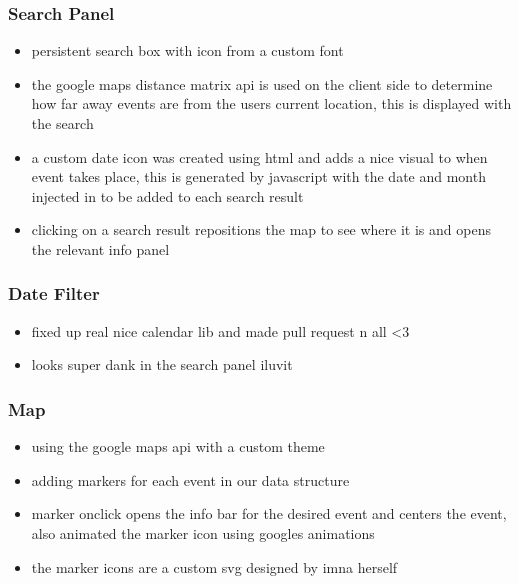 \documentclass[10pt]{article}
\begin{document}
            \subsubsection{Search Panel}

                \begin{itemize}
                    \item persistent search box with icon from a custom font
                    \item the google maps distance matrix api is used on the client side to determine how far away events are from the users current location, this is displayed with the search
                    \item a custom date icon was created using html and adds a nice visual to when event takes place, this is generated by javascript with the date and month injected in to be added to each search result
                    \item clicking on a search result repositions the map to see where it is and opens the relevant info panel
                \end{itemize}

            \subsubsection{Date Filter}
                \begin{itemize}
                    \item fixed up real nice calendar lib and made pull request n all \textless3
                    \item looks super dank in the search panel iluvit
                \end{itemize}

            \subsubsection{Map}
                \begin{itemize}
                    \item using the google maps api with a custom theme
                    \item adding markers for each event in our data structure
                    \item marker onclick opens the info bar for the desired event and centers the event, also animated the marker icon using googles animations
                    \item the marker icons are a custom svg designed by imna herself
                \end{itemize}
\end{document}
